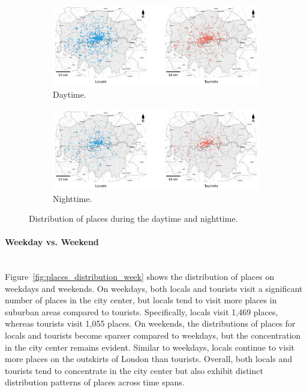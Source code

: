 \documentclass{article}
\newcommand{\subsubsubsection}[1]{\paragraph{#1}\mbox{}\\}
\theoremstyle{remark}
\begin{document}
\begin{figure}[!h]

\centering
\begin{subfigure}{0.6\textheight}
\centering
\includegraphics[width=0.9\linewidth]{figures/places_daytime.png} 
\caption{Daytime.}
\label{fig:places_daytime}
\end{subfigure}
\begin{subfigure}{0.6\textheight}
\centering
\includegraphics[width=0.9\linewidth]{figures/places_nighttime.png}
\caption{Nighttime.}
\label{fig:places_nighttime}
\end{subfigure}

\caption{Distribution of places during the daytime and nighttime.}
\label{fig:places_distribution_day}
\end{figure}


\subsubsubsection{Weekday vs. Weekend}
Figure~\ref{fig:places_distribution_week} shows the distribution of places on weekdays and weekends. On weekdays, both locals and tourists visit a significant number of places in the city center, but locals tend to visit more places in suburban areas compared to tourists. Specifically, locals visit 1,469 places, whereas tourists visit 1,055 places. On weekends, the distributions of places for locals and tourists become sparser compared to weekdays, but the concentration in the city center remains evident. Similar to weekdays, locals continue to visit more places on the outskirts of London than tourists. Overall, both locals and tourists tend to concentrate in the city center but also exhibit distinct distribution patterns of places across time spans.
\end{document}
